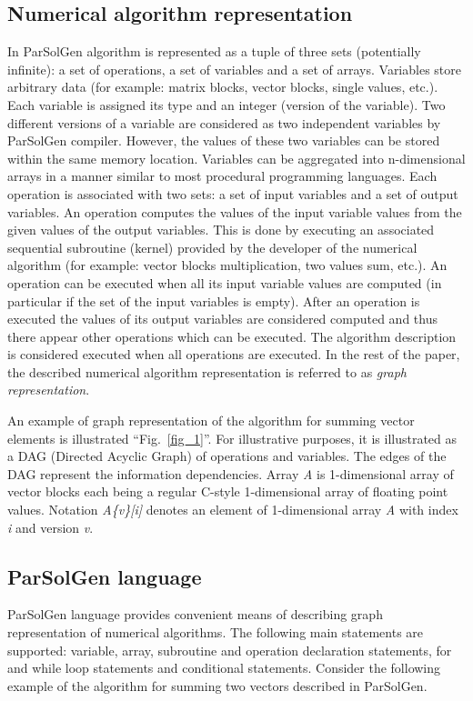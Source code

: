 \documentclass[conference]{IEEEtran}
\begin{document}
\subsection{Numerical algorithm representation}
In ParSolGen algorithm is represented as a tuple of three sets (potentially infinite): a set of operations, a set of  
variables and a set of arrays. 
Variables store arbitrary data (for example: matrix blocks, vector blocks, single values, etc.). Each variable is assigned its type and an integer (version of the variable). Two different versions of a variable 
are considered as two independent variables by ParSolGen compiler. However, the values of these two variables can 
be stored within the same memory location. Variables can be aggregated into n-dimensional arrays in a manner similar to most procedural programming languages. Each operation is associated with two sets: a set of input variables and 
a set of output variables. An operation computes the values of the input variable values from the given 
values of the output variables. This is done by executing an associated sequential subroutine (kernel) 
provided by the developer of the numerical algorithm 
(for example: vector blocks multiplication, two values sum, etc.). An operation 
can be executed when all its input variable values are computed (in particular if the set of the input variables is empty). After an operation is executed 
the values of its output variables are considered computed and thus there appear other operations which can 
be executed. The algorithm description is considered executed when all operations are executed. 
In the rest of the paper, the described numerical algorithm representation is referred to as \textit{graph representation}.

An example of graph representation of the algorithm for summing vector elements is illustrated ``Fig.~\ref{fig_1}''. For 
illustrative purposes, it is illustrated as a DAG (Directed Acyclic Graph) of operations and variables. 
The edges of the DAG represent the information dependencies.
Array \textit{A} is 1-dimensional array of vector blocks each being a regular C-style 
1-dimensional array of floating point values.
Notation \textit{A\{v\}[i]} denotes an element of 1-dimensional array \textit{A} with 
index \textit{i} and version \textit{v}.

\subsection{ParSolGen language}
ParSolGen language provides convenient means of describing graph representation of numerical algorithms.
The following main statements are supported: variable, array, subroutine and 
operation declaration statements, for and while loop statements and conditional statements.
Consider the following example of the algorithm for summing two vectors described in ParSolGen.
\end{document}
